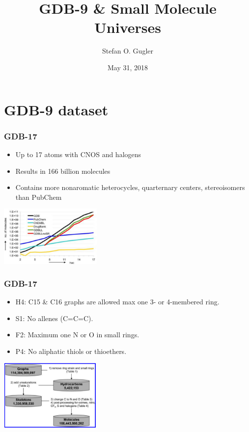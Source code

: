\documentclass[xcolor=dvipsnames]{beamer}
\title[Group Meeting]{GDB-9 \& Small Molecule Universes}
\date{May 31, 2018}
\author[Stefan O. Gugler]
{Stefan O. Gugler}
\institute[MIT]{Massachusetts Institute of Technology  \\Department of Chemical Engineering}
\begin{document}
	
\begin{frame}
	\titlepage
\end{frame}
%
\begin{frame}
	\tableofcontents
\end{frame}

\section{GDB-9 dataset}

\begin{frame}
\frametitle{GDB-17}
\begin{itemize}
\item Up to 17 atoms with CNOS and halogens
\item Results in 166 billion molecules
\item Contains more nonaromatic heterocycles, quarternary centers, stereoisomers than PubChem
\end{itemize}
\begin{center}
\includegraphics[width=5cm]{img/gdb9_size.png}
\end{center}
\end{frame}

\begin{frame}
\frametitle{GDB-17}
\begin{itemize}
\item H4: C15 \& C16 graphs are allowed max one 3- or 4-membered ring.
\item S1: No allenes (C=C=C).
\item F2: Maximum one N or O in small rings.
\item P4: No aliphatic thiols or thioethers.
\end{itemize}
\begin{center}
\includegraphics[width=5cm]{img/gdb9.png}
\end{center}
\end{frame}
\end{document}
